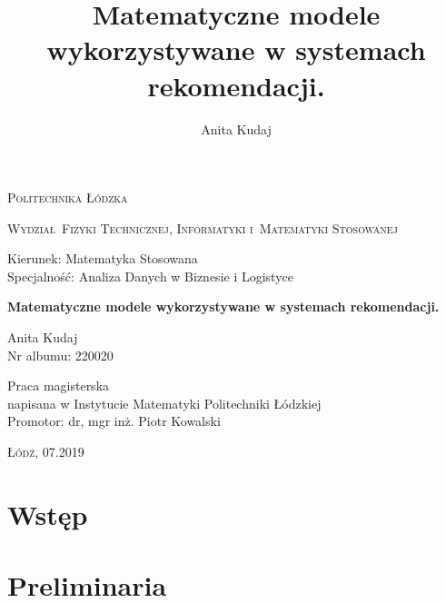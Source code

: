 \documentclass[12pt,a4paper]{report}
\author{Anita Kudaj}
\title{Matematyczne modele wykorzystywane w systemach rekomendacji.}
\begin{document}
\begin{titlepage}
\begin{flushleft}
\end{flushleft}
\begin{center}
\textsc{{\huge Politechnika \L\'odzka}}
\end{center}
\bigskip
\bigskip
\begin{center}
\textsc{{\Large Wydzia\l\ Fizyki Technicznej, Informatyki i~Matematyki Stosowanej}}
\end{center}
\bigskip
\bigskip
\begin{Large}
Kierunek: Matematyka Stosowana\\
Specjalno\'s\'c: Analiza Danych w Biznesie i Logistyce
\\
\end{Large}
\bigskip
\bigskip
\noindent\hrulefill
\begin{center}
{\textbf{{\Large Matematyczne modele wykorzystywane w systemach rekomendacji.}}}
\end{center}
\begin{flushright}
{\large 
Anita Kudaj
\\
Nr albumu: 
220020
\\}
\end{flushright}
\noindent\hrulefill
\bigskip
\bigskip
\begin{center}
{\large Praca magisterska
\\napisana w Instytucie Matematyki Politechniki Łódzkiej\\ 
\bigskip
\bigskip
\bigskip
\bigskip
Promotor: dr, mgr inż. Piotr Kowalski
 }
\end{center}
\bigskip
\bigskip
\bigskip
\bigskip
\begin{center}
{\textsc{\large \L\'od\'z, 07.2019}}
\end{center}
\end{titlepage}


\tableofcontents

\chapter{Wstęp}
\chapter{Preliminaria} %
\end{document}
